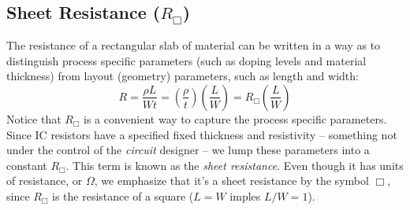 \subsection{Sheet Resistance ($R_{\Box}$)} \label{sec:sheetR}
The resistance of a rectangular slab of material can be written in a way as to distinguish process specific parameters (such as doping levels and material thickness) from layout (geometry) parameters, such as length and width: 
\begin{equation} 
	R = \frac{{\rho L}}{{Wt}} = \left( {\frac{\rho }{t}} \right)\left( {\frac{L}{W}} \right) = {R_{\Box}}\left( {\frac{L}{W}} \right)
\end{equation}
Notice that $R_{\Box}$ is a convenient way to capture the process specific parameters.  Since  IC resistors have a specified fixed thickness and resistivity – something not under the control of the \textit{circuit} designer – we lump these parameters into a constant $R_{\Box}$.  This term is known as the \textit{sheet resistance}.  Even though it has units of resistance, or $\Omega$, we emphasize that it's a sheet resistance by the symbol $\Box$, since $R_{\Box}$ is the resistance of a square ($L = W$ imples $L/W = 1$).  
